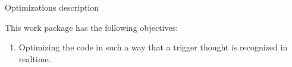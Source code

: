 
\begin{workpackage}{Optimizations}
  \label{wp:opt} %
description



  \makewptable %
    
  \begin{wpobjectives}
    This work package has the following objectives:
    \begin{enumerate}
 \item Optimizing the code in such a way that a trigger thought is recognized 
in realtime.
    \end{enumerate}
  \end{wpobjectives}
  
  \begin{wpdescription}
 

    
  \end{wpdescription}
  
  \begin{wpdeliverables}


\end{wpdeliverables}
\end{workpackage}
